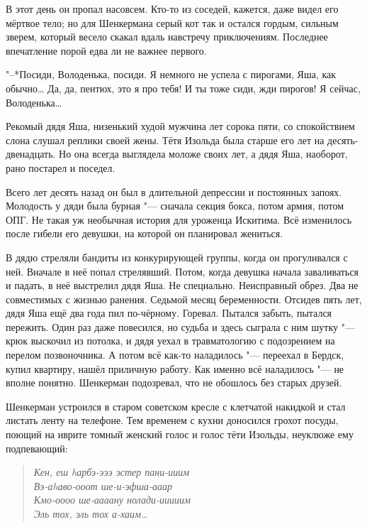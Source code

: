 В этот день он пропал насовсем.
Кто-то из соседей, кажется, даже видел его мёртвое тело;
но для Шенкермана серый кот так и остался гордым, сильным зверем, который весело скакал вдаль навстречу приключениям.
Последнее впечатление порой едва ли не важнее первого.

\asterism

"--*Посиди, Володенька, посиди.
Я немного не успела с пирогами, Яша, как обычно\ldots{}
Да, да, пентюх, это я про тебя!
И ты тоже сиди, жди пирогов!
Я сейчас, Володенька\ldots{}

Рекомый дядя Яша, низенький худой мужчина лет сорока пяти, со спокойствием слона слушал реплики своей жены.
Тётя Изольда была старше его лет на десять-двенадцать.
Но она всегда выглядела моложе своих лет, а дядя Яша, наоборот, рано постарел и поседел.

Всего лет десять назад он был в длительной депрессии и постоянных запоях.
Молодость у дяди была бурная "--- сначала секция бокса, потом армия, потом ОПГ.
Не такая уж необычная история для уроженца Искитима.
Всё изменилось после гибели его девушки, на которой он планировал жениться.

В дядю стреляли бандиты из конкурирующей группы, когда он прогуливался с ней.
Вначале в неё попал стрелявший.
Потом, когда девушка начала заваливаться и падать, в неё выстрелил дядя Яша.
Не специально.
Неисправный обрез.
Два не совместимых с жизнью ранения.
Седьмой месяц беременности.
Отсидев пять лет, дядя Яша ещё два года пил по-чёрному.
Горевал.
Пытался забыть, пытался пережить.
Один раз даже повесился, но судьба и здесь сыграла с ним шутку "--- крюк выскочил из потолка, и дядя уехал в травматологию с подозрением на перелом позвоночника.
А потом всё как-то наладилось "--- переехал в Бердск, купил квартиру, нашёл приличную работу.
Как именно всё наладилось "--- не вполне понятно.
Шенкерман подозревал, что не обошлось без старых друзей.

\asterism

Шенкерман устроился в старом советском кресле с клетчатой накидкой и стал листать ленту на телефоне.
Тем временем с кухни доносился грохот посуды, поющий на иврите томный женский голос и голос тёти Изольды, неуклюже ему подпевающий:

\begin{quote}
\textit{
Кен, еш hарбэ-эээ эстер пани-ииим\\
Вэ-аhаво-ооот ше-и-эфша-ааар\\
Кмо-оооо ше-аааану нолади-ииииим\\
Эль тох, эль тох а-хаим\ldots{}
}
\end{quote}

